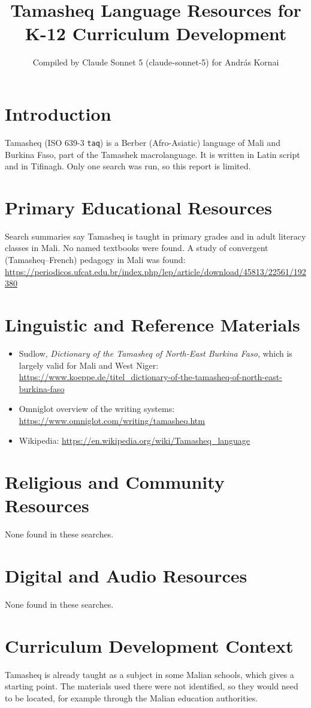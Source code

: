 \documentclass[12pt]{article}
\title{Tamasheq Language Resources for K-12 Curriculum Development}
\author{Compiled by Claude Sonnet 5 (claude-sonnet-5) for Andr\'as Kornai}
\date{}
\begin{document}
\maketitle
\section{Introduction}
Tamasheq (ISO 639-3 \texttt{taq}) is a Berber (Afro-Asiatic) language of Mali and Burkina Faso, part of the Tamashek macrolanguage. It is written in Latin script and in Tifinagh. Only one search was run, so this report is limited.
\section{Primary Educational Resources}
Search summaries say Tamasheq is taught in primary grades and in adult literacy classes in Mali. No named textbooks were found. A study of convergent (Tamasheq--French) pedagogy in Mali was found: \url{https://periodicos.ufcat.edu.br/index.php/lep/article/download/45813/22561/192380}
\section{Linguistic and Reference Materials}
\begin{itemize}
\item Sudlow, \emph{Dictionary of the Tamasheq of North-East Burkina Faso}, which is largely valid for Mali and West Niger: \url{https://www.koeppe.de/titel_dictionary-of-the-tamasheq-of-north-east-burkina-faso}
\item Omniglot overview of the writing systems: \url{https://www.omniglot.com/writing/tamasheq.htm}
\item Wikipedia: \url{https://en.wikipedia.org/wiki/Tamasheq_language}
\end{itemize}
\section{Religious and Community Resources}
None found in these searches.
\section{Digital and Audio Resources}
None found in these searches.
\section{Curriculum Development Context}
Tamasheq is already taught as a subject in some Malian schools, which gives a starting point. The materials used there were not identified, so they would need to be located, for example through the Malian education authorities.
\end{document}
